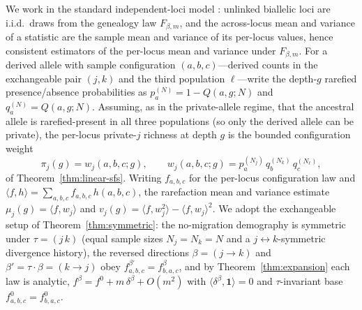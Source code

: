 \documentclass[11pt]{article}
\theoremstyle{plain}
\theoremstyle{definition}
\theoremstyle{remark}
\begin{document}
We work in the standard independent-loci model \citep{sawyer1992population}: unlinked biallelic
loci are i.i.d.\ draws from the genealogy law $F_{\beta,m}$, and the across-locus mean and
variance of a statistic are the sample mean and variance of its per-locus values, hence
consistent estimators of the per-locus mean and variance under $F_{\beta,m}$. For a derived
allele with sample configuration $(a,b,c)$---derived counts in the exchangeable pair $(j,k)$ and
the third population $\ell$---write the depth-$g$ rarefied presence/absence probabilities as
$p^{(N)}_a=1-Q(a,g;N)$ and $q^{(N)}_a=Q(a,g;N)$. Assuming, as in the private-allele regime, that
the ancestral allele is rarefied-present in all three populations (so only the derived allele
can be private), the per-locus private-$j$ richness at depth $g$ is the bounded configuration
weight
\[
\pi_j(g)=w_j(a,b,c;g),\qquad w_j(a,b,c;g)=p^{(N_j)}_a\,q^{(N_k)}_b\,q^{(N_\ell)}_c,
\]
of Theorem~\ref{thm:linear-sfs}. Writing $f_{a,b,c}$ for the per-locus configuration law and
$\langle f,h\rangle=\sum_{a,b,c}f_{a,b,c}\,h(a,b,c)$, the rarefaction mean and variance estimate
$\mu_j(g)=\langle f,w_j\rangle$ and $v_j(g)=\langle f,w_j^2\rangle-\langle f,w_j\rangle^2$. We
adopt the exchangeable setup of Theorem~\ref{thm:symmetric}: the no-migration demography is
symmetric under $\tau=(j\,k)$ (equal sample sizes $N_j=N_k=N$ and a
$j\!\leftrightarrow\!k$-symmetric divergence history), the reversed directions
$\beta=(j\!\to\!k)$ and $\beta'=\tau\!\cdot\!\beta=(k\!\to\!j)$ obey
$f^{\beta'}_{a,b,c}=f^{\beta}_{b,a,c}$, and by Theorem~\ref{thm:expansion} each law is analytic,
$f^{\beta}=f^{0}+m\,\delta^{\beta}+O(m^2)$ with $\langle\delta^\beta,\mathbf 1\rangle=0$ and
$\tau$-invariant base $f^0_{a,b,c}=f^0_{b,a,c}$.
\end{document}
